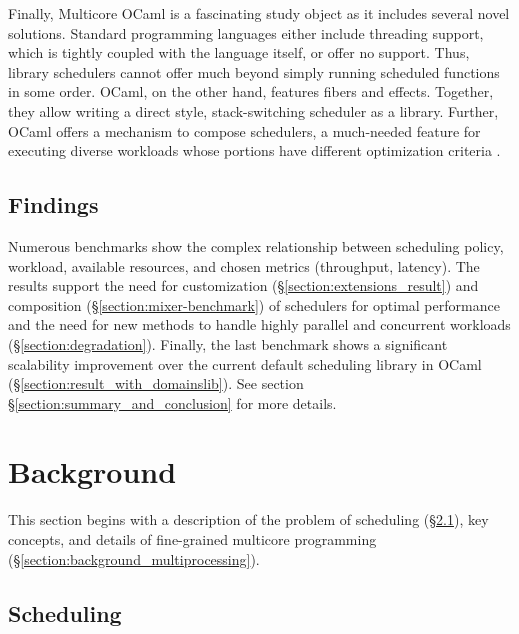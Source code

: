 \documentclass[12pt,a4paper,twoside]{report}
\begin{document}
Finally, Multicore OCaml is a fascinating study object as it includes several novel solutions. Standard programming languages either include threading support, which is tightly coupled with the language itself, or offer no support. Thus, library schedulers cannot offer much beyond simply running scheduled functions in some order. OCaml, on the other hand, features fibers and effects. Together, they allow writing a direct style, stack-switching scheduler as a library. Further, OCaml offers a mechanism to compose schedulers, a much-needed feature for executing diverse workloads whose portions have different optimization criteria \cite{Tennenhouse89layeredmultiplexing}.

\section{Findings}
\label{section:findings}

Numerous benchmarks show the complex relationship between scheduling policy, workload, available resources, and chosen metrics (throughput, latency). The results support the need for customization (\S\ref{section:extensions_result}) and composition (\S\ref{section:mixer-benchmark}) of schedulers for optimal performance and the need for new methods to handle highly parallel and concurrent workloads (\S\ref{section:degradation}). Finally, the last benchmark shows a significant scalability improvement over the current default scheduling library in OCaml (\S\ref{section:result_with_domainslib}). See section \S\ref{section:summary_and_conclusion} for more details.


\chapter{Background}

This section begins with a description of the problem of scheduling (\S\ref{section:background_schedulers}), key concepts, and details of fine-grained multicore programming (\S\ref{section:background_multiprocessing}).

\section{Scheduling}
\label{section:background_schedulers}
\end{document}
